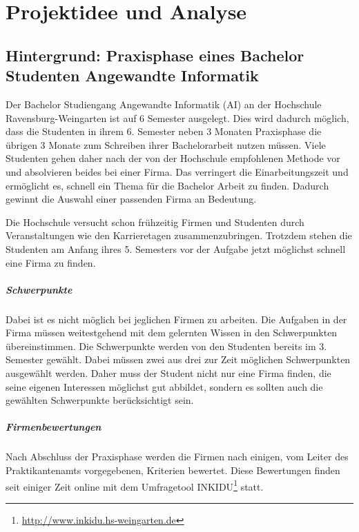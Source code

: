 %
%
\chapter{Projektidee und Analyse}
\label{cap-projektidee}

\section{Hintergrund: Praxisphase eines Bachelor Studenten Angewandte Informatik}
\label{sec-idee-hintergrund}

Der Bachelor Studiengang Angewandte Informatik (AI) an der Hochschule Ravensburg-Weingarten ist auf 6 Semester ausgelegt. Dies wird dadurch möglich, dass die Studenten in ihrem 6. Semester neben 3 Monaten Praxisphase die übrigen 3 Monate zum Schreiben ihrer Bachelorarbeit nutzen müssen. Viele Studenten gehen daher nach der von der Hochschule empfohlenen Methode vor und absolvieren beides bei einer Firma. Das verringert die Einarbeitungszeit und ermöglicht es, schnell ein Thema für die Bachelor Arbeit zu finden. Dadurch gewinnt die Auswahl einer passenden Firma an Bedeutung.

Die Hochschule versucht schon frühzeitig Firmen und Studenten durch Veranstaltungen wie den Karrieretagen zusammenzubringen. Trotzdem stehen die Studenten am Anfang ihres 5. Semesters vor der Aufgabe jetzt möglichst schnell eine Firma zu finden. 

\paragraph{Schwerpunkte}
Dabei ist es nicht möglich bei jeglichen Firmen zu arbeiten. Die Aufgaben in der Firma müssen weitestgehend mit dem gelernten Wissen in den Schwerpunkten übereinstimmen. Die Schwerpunkte werden von den Studenten bereits im 3. Semester gewählt. Dabei müssen zwei aus drei zur Zeit möglichen Schwerpunkten ausgewählt werden. Daher muss der Student nicht nur eine Firma finden, die seine eigenen Interessen möglichst gut abbildet, sondern es sollten auch die gewählten Schwerpunkte berücksichtigt sein.

\paragraph{Firmenbewertungen}
Nach Abschluss der Praxisphase werden die Firmen nach einigen, vom Leiter des Praktikantenamts vorgegebenen, Kriterien bewertet. Diese Bewertungen finden seit einiger Zeit online mit dem Umfragetool \gls{INKIDU}\footnote{\url{http://www.inkidu.hs-weingarten.de}} statt.

